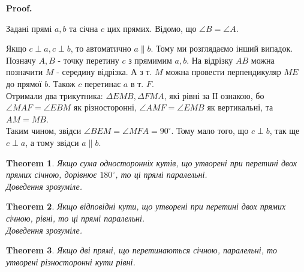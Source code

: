 \documentclass[a4paper, 10pt]{article}
\makeatletter
\def\qed{$\blacksquare$}
\theoremstyle{theoremdd}
\newtheorem{theorem}{Theorem}[subsection]
\theoremstyle{theoremdd}
\theoremstyle{theoremdd}
\theoremstyle{theoremdd}
\theoremstyle{theoremdd}
\theoremstyle{theoremdd}
\theoremstyle{theoremdd}
\theoremstyle{theoremdd}
\theoremstyle{theoremdd}
\renewenvironment{proof}[1][Proof.\\]{\par
\pushQED{\hfill \qed}%
\normalfont \topsep6\p@\@plus6\p@\relax
\trivlist
\item\relax
{\bfseries
#1\@addpunct{.}}\hspace\labelsep\ignorespaces
}{%
\popQED\endtrivlist\@endpefalse
}
\makeatother
\begin{document}
\begin{proof}
Задані прямі $a,b$ та січна $c$ цих прямих. Відомо, що $\angle B = \angle A$.
\begin{figure}[H]
\centering
{}
\end{figure}
Якщо $c \perp a, c \perp b$, то автоматично $a \parallel b$. Тому ми розглядаємо інший випадок.\\
Позначу $A,B$ - точку перетину $c$ з прямимим $a,b$. На відрізку $AB$ можна позначити $M$ - середину відрізка. А з т. $M$ можна провести перпендикуляр $ME$ до прямої $b$. Також $c$ перетинає $a$ в т. $F$.\\
Отримали два трикутника: $\Delta EMB, \Delta FMA$, які рівні за ІІ ознакою, бо $\angle MAF = \angle EBM$ як різносторонні, $\angle AMF = \angle EMB$ як вертикальні, та $AM = MB$.\\
Таким чином, звідси $\angle BEM = \angle MFA = 90^\circ$. Тому мало того, що $c \perp b$, так ще $c \perp a$, а тому звідси $a \parallel b$.
\end{proof}

\begin{theorem}
Якщо сума односторонніх кутів, що утворені при перетині двох прямих січною, дорівнює $180^\circ$, то ці прямі паралельні.\\
\textit{Доведення зрозуміле.}
\end{theorem}

\begin{theorem}
Якщо відповідні кути, що утворені при перетині двох прямих січною, рівні, то ці прямі паралельні.\\
\textit{Доведення зрозуміле.}
\end{theorem}

\begin{theorem}
Якщо дві прямі, що перетинаються січною, паралельні, то утворені різносторонні кути рівні.
\end{theorem}
\end{document}
